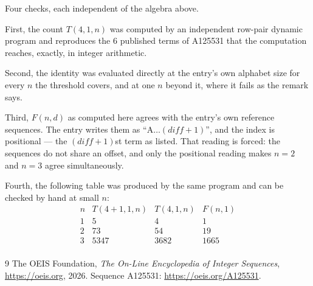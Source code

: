 \documentclass[11pt,a4paper]{article}
\theoremstyle{plain}
\theoremstyle{definition}
\begin{document}
Four checks, each independent of the algebra above.

First, the count $T(4,1,n)$ was computed by an independent row-pair dynamic program and
reproduces the $6$ published terms of A125531 that the computation reaches,
exactly, in integer arithmetic.

Second, the identity was evaluated directly at the entry's own alphabet size for every $n$ the
threshold covers, and at one $n$ beyond it, where it fails as the remark says.

Third, $F(n,d)$ as computed here agrees with the entry's own reference sequences. The entry
writes them as ``$\mathrm{A}\dots(\mathit{diff}+1)$'', and the index is positional --- the
$(\mathit{diff}+1)$st term as listed. That reading is forced: the sequences do not share an
offset, and only the positional reading makes $n=2$ and $n=3$ agree simultaneously.

Fourth, the following table was produced by the same program and can be checked by hand at
small $n$:
\[
\begin{array}{rrrr}
n & T(4+1,1,n) & T(4,1,n) & F(n,1) \\ \hline
1 & 5 & 4 & 1 \\
2 & 73 & 54 & 19 \\
3 & 5347 & 3682 & 1665 \\
\end{array}
\]

\begin{thebibliography}{9}
 The OEIS Foundation, \emph{The On-Line Encyclopedia of Integer Sequences},
\url{https://oeis.org}, 2026. Sequence A125531: \url{https://oeis.org/A125531}.
\end{thebibliography}
\end{document}
